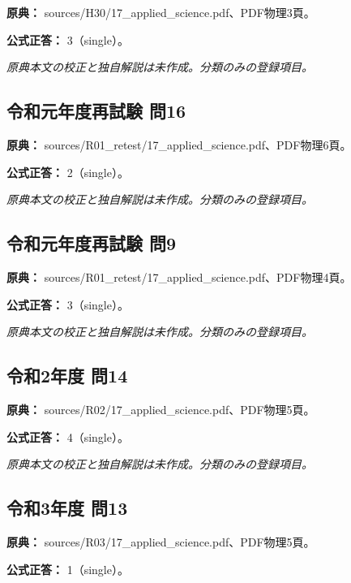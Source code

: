 \noindent\textbf{原典：} sources/H30/17\_applied\_science.pdf、PDF物理3頁。

\textbf{公式正答：} 3（single）。

\par\textit{原典本文の校正と独自解説は未作成。分類のみの登録項目。}

\subsection{令和元年度再試験 問16}
\label{q:r01-ret-applied-16}

\noindent\textbf{原典：} sources/R01\_retest/17\_applied\_science.pdf、PDF物理6頁。

\textbf{公式正答：} 2（single）。

\par\textit{原典本文の校正と独自解説は未作成。分類のみの登録項目。}

\subsection{令和元年度再試験 問9}
\label{q:r01-ret-applied-09}

\noindent\textbf{原典：} sources/R01\_retest/17\_applied\_science.pdf、PDF物理4頁。

\textbf{公式正答：} 3（single）。

\par\textit{原典本文の校正と独自解説は未作成。分類のみの登録項目。}

\subsection{令和2年度 問14}
\label{q:r02-reg-applied-14}

\noindent\textbf{原典：} sources/R02/17\_applied\_science.pdf、PDF物理5頁。

\textbf{公式正答：} 4（single）。

\par\textit{原典本文の校正と独自解説は未作成。分類のみの登録項目。}

\subsection{令和3年度 問13}
\label{q:r03-reg-applied-13}

\noindent\textbf{原典：} sources/R03/17\_applied\_science.pdf、PDF物理5頁。

\textbf{公式正答：} 1（single）。

